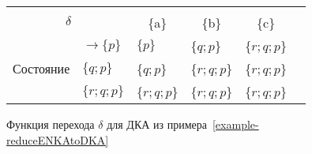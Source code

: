 \begin{figure}[t]
\centering
\begin{tabular}{llllll}
\toprule
%
\multicolumn{2}{c}{\multirow{2}{*}{\Large $\delta$}}
	& \multicolumn{3}{c}{\text{Вход}} \\
%
\cmidrule(rl){3-5}
%
\multicolumn{2}{c}{}
    & \multicolumn{1}{c}{\{a\}}
    & \multicolumn{1}{c}{\{b\}}
    & \multicolumn{1}{c}{\{c\}} \\
%
\midrule
%
\multirow{5}{*}{Состояние}
    & $\to \{p\}$ & $\{p\}$  		& \{$q;p$\} 		& \{$r;q;p$\}  	\\
    & $\{q;p\}$ & \{$q;p$\} 	& \{$r;q;p$\} 		& \{$r;q;p$\} 	     \\
    & $\boxed{\{r;q;p\}}$ & \{$r;q;p$\} 	& \{$r;q;p$\} 		& \{$r;q;p$\} 	\\
\bottomrule
\end{tabular}
\caption{Функция перехода $\delta$ для ДКА из примера~\ref{example-reduceENKAtoDKA}}
\label{tab6}
\end{figure}
